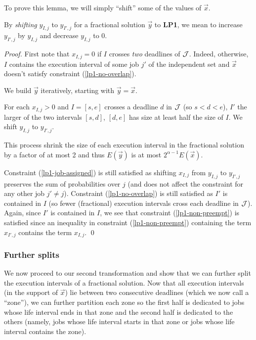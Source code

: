 To prove this lemma, we will simply ``shift'' some of the values of $\vec{x}$.
\begin{defn}
  By \emph{shifting} $y_{I,j}$ to $y_{I',j}$ for a fractional solution $\vec{y}$ to \textbf{LP1}, we mean to increase $y_{I',j}$ by $y_{I,j}$ and decrease $y_{I,j}$ to 0.
\end{defn}

\begin{proof}
  First note that $x_{I,j}=0$ if $I$ crosses \emph{two} deadlines of $\cal{J}$. Indeed, otherwise, $I$ contains the execution interval of some job $j'$ of the independent set and $\vec{x}$ doesn't satisfy constraint (\ref{lp1-no-overlap}).

  We build $\vec{y}$ iteratively, starting with $\vec{y}=\vec{x}$.

  For each $x_{I,j}>0$ and $I=[s,e]$ crosses a deadline $d$ in $\cal{J}$ (so $s<d<e$), $I'$ the larger of the two intervals $[s,d]$, $[d,e]$ has size at least half the size of $I$. We shift $y_{I,j}$ to $y_{I',j}$. 

  This process shrink the size of each execution interval in the fractional solution by a factor of at most 2 and thus $E(\vec{y})$ is at most $2^{\alpha-1}E(\vec{x})$.

  Constraint (\ref{lp1-job-assigned}) is still satisfied as shifting $x_{I,j}$ from $y_{I,j}$ to $y_{I',j}$ preserves the sum of probabilities over $j$ (and does not affect the constraint for any other job $j' \ne j$).
  Constraint (\ref{lp1-no-overlap}) is still satisfied as $I'$ is contained in $I$ (so fewer (fractional) execution intervals cross each deadline in $\cal{J}$).
  Again, since $I'$ is contained in $I$, we see that constraint (\ref{lp1-non-preempt}) is satisfied since an inequality in constraint (\ref{lp1-non-preempt}) containing the term $x_{I',j}$ contains the term $x_{I,j}$.
\qed\end{proof}




\subsubsection{Further splits}

We now proceed to our second transformation and show that we can further split the execution intervals of a fractional solution. Now that all execution intervals
(in the support of $\vec{x}$) lie between two consecutive deadlines (which we now call a ``zone''), we can further partition each zone so the first half
is dedicated to jobs whose life interval ends in that zone and the second half is dedicated to the others (namely, jobs whose life interval starts
in that zone or jobs whose life interval contains the zone).



